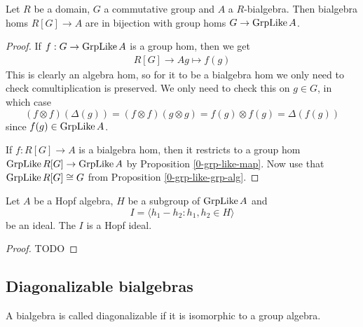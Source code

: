\begin{proposition}
  \label{0-grp-alg-grp-like-gc}

  Let $R$ be a domain, $G$ a commutative group and $A$ a $R$-bialgebra.
  Then bialgebra homs $R[G] \to A$ are in bijection with group homs $G \to \operatorname{GrpLike} A$.
\end{proposition}
\begin{proof}

  If $f : G \to \operatorname{GrpLike} A$ is a group hom, then we get
  \begin{align*}
    R[G] \to A
    g \mapsto f(g)
  \end{align*}
  This is clearly an algebra hom,
  so for it to be a bialgebra hom we only need to check comultiplication is preserved.
  We only need to check this on $g \in G$, in which case
  \[(f \otimes f)(\Delta(g)) = (f \otimes f)(g \otimes g) = f(g) \otimes f(g) = \Delta(f(g))\]
  since $f(g) \in \operatorname{GrpLike} A$.

  If $f : R[G] \to A$ is a bialgebra hom,
  then it restricts to a group hom $\operatorname{GrpLike} R[G] \to \operatorname{GrpLike} A$
  by Proposition \ref{0-grp-like-map}.
  Now use that $\operatorname{GrpLike} R[G] \cong G$ from Proposition \ref{0-grp-like-grp-alg}.
\end{proof}


\begin{proposition}
  \label{0-grp-like-quot-hopf}

  Let $A$ be a Hopf algebra, $H$ be a subgroup of $\operatorname{GrpLike} A$ and
  \[
    I = \langle h_1 - h_2 : h_1,h_2 \in H \rangle
  \]
  be an ideal. The $I$ is a Hopf ideal.
\end{proposition}
\begin{proof}
  \uses{}

  TODO
\end{proof}


\subsection{Diagonalizable bialgebras}


\begin{definition}
  \label{0-is-diag-bialg}
  \uses{}
  \leanok

  A bialgebra is called diagonalizable if it is isomorphic to a group algebra.
\end{definition}


